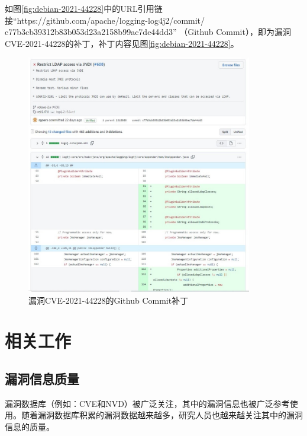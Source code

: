 如图\ref{fig:debian-2021-44228}中的URL引用链接“https://github.com/apache/logging-log4j2/commit/\\c77b3cb39312b83b053d23a2158b99ac7de44dd3” （Github Commit），即为漏洞CVE-2021-44228的补丁，补丁内容见图\ref{fig:debian-2021-44228}。

\begin{figure}[h]
    \centering
    \includegraphics[width=0.88\textwidth]{fig/commit-2021-44228}
    \caption{漏洞CVE-2021-44228的Github Commit补丁}
    \label{fig:commit-2021-44228}
\end{figure}



\section{相关工作}
\subsection{漏洞信息质量}
漏洞数据库（例如：CVE和NVD）被广泛关注，其中的漏洞信息也被广泛参考使用。随着漏洞数据库积累的漏洞数据越来越多，研究人员也越来越关注其中的漏洞信息的质量。


